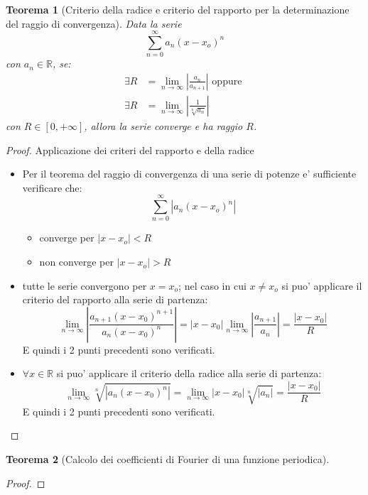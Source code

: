\documentclass[12pt, a4paper]{article}
\theoremstyle{break}
\newtheorem{theorem}{Teorema}[section]
\begin{document}
\newpage
\begin{theorem} [Criterio della radice e criterio del rapporto per la
	determinazione del raggio di convergenza]
	Data la serie
	\[
		\sum_{n=0}^{\infty} a_n (x - x_o)^n
	\]
	con $a_n \in
		\mathbb{R}$, se:
	\begin{align*}
		\exists R & = \lim_{n \rightarrow \infty} \left| \frac{a_n}{a_{n+1}}
		\right| \text{ oppure }                                                  \\
		\exists R & = \lim_{n \rightarrow \infty} \left| \frac{1}{\sqrt[n]{a_n}}
		\right|
	\end{align*}
	con $R \in [0,+\infty]$, allora la serie converge e ha raggio $R$.
\end{theorem}
\begin{proof} Applicazione dei criteri del rapporto e della radice
	\begin{itemize}
		\item Per il teorema del raggio di convergenza di una serie di potenze
			e' sufficiente verificare che:
			\[
				\sum_{n=0}^{\infty} \left| a_n (x - x_o)^n \right|
			\]
			\begin{itemize}
				\item converge per $|x - x_o| < R$
				\item non converge per $|x - x_o| > R$
			\end{itemize}
		\item tutte le serie convergono per $x = x_o$; nel caso in cui $x \neq
				x_o$ si puo' applicare il criterio del rapporto alla serie di
			partenza:
			\[
				\lim_{n \rightarrow \infty} \left| \frac{a_{n+1}(x-x_0)^{n+1}}
				{a_n (x-x_0)^n} \right| = \left| x - x_0 \right| \lim_{n
				\rightarrow \infty} \left| \frac{a_{n+1}}{a_n} \right| =
				\frac{\left| x -
				x_0 \right|}{R}
			\]
			E quindi i 2 punti precedenti sono verificati.
		\item $\forall x \in \mathbb{R} $ si puo' applicare il criterio della
			radice alla serie di partenza:
			\[
				\lim_{n \rightarrow \infty} \sqrt[n]{\left| a_n (x-x_0)^n
				\right|} = \lim_{n \rightarrow \infty} \left| x - x_0 \right|
				\sqrt[n]{\left| a_n \right|} = \frac{\left| x - x_0 \right|}{R}
			\]
			E quindi i 2 punti precedenti sono verificati.
	\end{itemize}
\end{proof}

\newpage
\begin{theorem} [Calcolo dei coefficienti di Fourier di una funzione periodica]
\end{theorem}
\begin{proof}
\end{proof}
\end{document}
